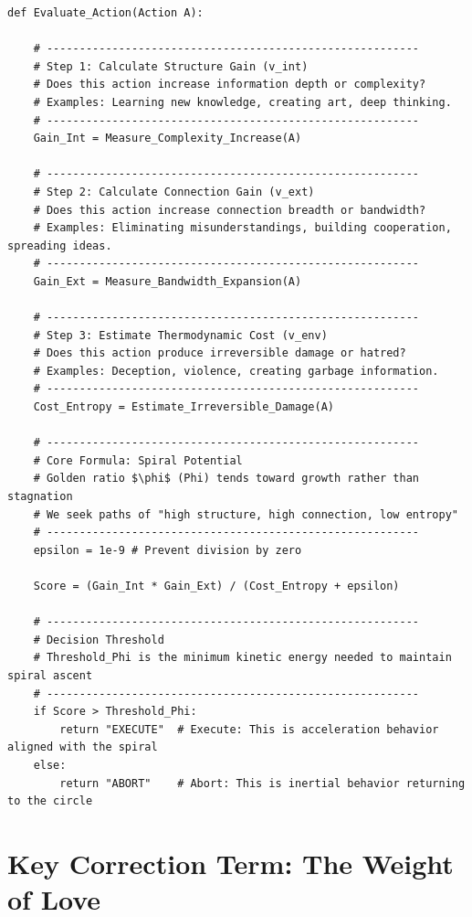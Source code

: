 \begin{verbatim}
def Evaluate_Action(Action A):

    # ---------------------------------------------------------
    # Step 1: Calculate Structure Gain (v_int)
    # Does this action increase information depth or complexity?
    # Examples: Learning new knowledge, creating art, deep thinking.
    # ---------------------------------------------------------
    Gain_Int = Measure_Complexity_Increase(A)
    
    # ---------------------------------------------------------
    # Step 2: Calculate Connection Gain (v_ext)
    # Does this action increase connection breadth or bandwidth?
    # Examples: Eliminating misunderstandings, building cooperation, spreading ideas.
    # ---------------------------------------------------------
    Gain_Ext = Measure_Bandwidth_Expansion(A)
    
    # ---------------------------------------------------------
    # Step 3: Estimate Thermodynamic Cost (v_env)
    # Does this action produce irreversible damage or hatred?
    # Examples: Deception, violence, creating garbage information.
    # ---------------------------------------------------------
    Cost_Entropy = Estimate_Irreversible_Damage(A)
    
    # ---------------------------------------------------------
    # Core Formula: Spiral Potential
    # Golden ratio $\phi$ (Phi) tends toward growth rather than stagnation
    # We seek paths of "high structure, high connection, low entropy"
    # ---------------------------------------------------------
    epsilon = 1e-9 # Prevent division by zero
    
    Score = (Gain_Int * Gain_Ext) / (Cost_Entropy + epsilon)
    
    # ---------------------------------------------------------
    # Decision Threshold
    # Threshold_Phi is the minimum kinetic energy needed to maintain spiral ascent
    # ---------------------------------------------------------
    if Score > Threshold_Phi:
        return "EXECUTE"  # Execute: This is acceleration behavior aligned with the spiral
    else:
        return "ABORT"    # Abort: This is inertial behavior returning to the circle
\end{verbatim}

\section{Key Correction Term: The Weight of Love}

